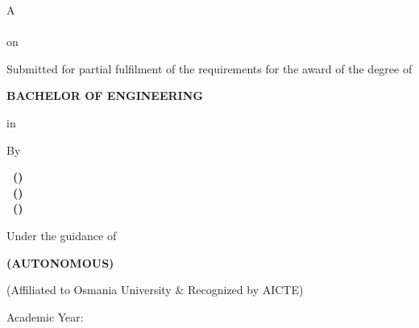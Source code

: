 \begin{titlepage}
\thispagestyle{empty}
\centering
\setlength{\parindent}{0pt}
\setlength{\parskip}{0pt}
\vspace*{0.1cm}
{\fontsize{12}{14}\selectfont A\\[0.08cm]\ReportType\\[0.08cm]on\par}
\vspace{0.3cm}
{\fontsize{14}{17}\selectfont\bfseries\ProjectTitle\par}
\vspace{0.35cm}
{\fontsize{11}{14}\selectfont Submitted for partial fulfilment of the requirements for the award of the degree of\par}
\vspace{0.3cm}
{\fontsize{12}{14}\selectfont\bfseries BACHELOR OF ENGINEERING\par}
\vspace{0.15cm}
in\par
\vspace{0.15cm}
{\fontsize{12}{15}\selectfont\bfseries\DegreeStream\par}
\vspace{0.3cm}
By\par
\vspace{0.2cm}
{\fontsize{12}{16}\selectfont\bfseries
\StudentOne\ (\RollOne)\\
\StudentTwo\ (\RollTwo)\\
\StudentThree\ (\RollThree)\par}
\vspace{0.35cm}
Under the guidance of\par
\vspace{0.15cm}
{\fontsize{12}{15}\selectfont\bfseries\GuideName\par}
\vspace{0.05cm}
\GuideDesignation\par
\Department\par
\vfill
\Logo\par
\vspace{0.2cm}
{\fontsize{14}{17}\selectfont\bfseries\CollegeName\par}
\vspace{0.08cm}
{\bfseries (AUTONOMOUS)}\par
\vspace{0.08cm}
\Department\par
\vspace{0.08cm}
{\fontsize{10}{12}\selectfont (Affiliated to Osmania University \& Recognized by AICTE)\par}
\vspace{0.08cm}
\CollegeLocation\par
\vspace{0.08cm}
Academic Year: \AcademicYear\par
\vspace*{0.1cm}
\end{titlepage}
